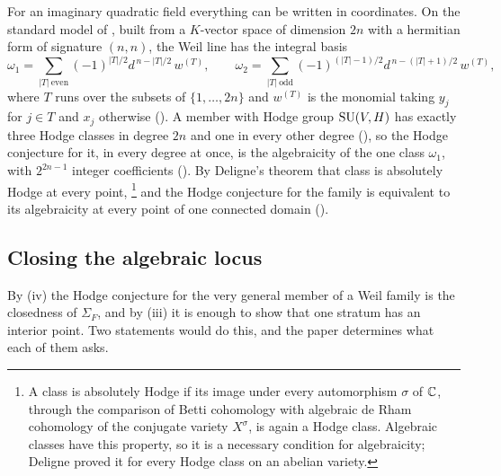 For an imaginary quadratic field everything can be written in coordinates.
On the standard model of , built from a $K$-vector space of
dimension $2n$ with a hermitian form of signature $(n,n)$, the Weil line has
the integral basis
\[
  \omega_{1}=\sum_{|T|\ \mathrm{even}}(-1)^{|T|/2}d^{\,n-|T|/2}\,w^{(T)},
  \qquad
  \omega_{2}=\sum_{|T|\ \mathrm{odd}}(-1)^{(|T|-1)/2}d^{\,n-(|T|+1)/2}\,w^{(T)},
\]
where $T$ runs over the subsets of $\{1,\dots,2n\}$ and $w^{(T)}$ is the
monomial taking $y_{j}$ for $j\in T$ and $x_{j}$ otherwise
(). A member with Hodge group $\operatorname{SU}(V,H)$ has exactly
three Hodge classes in degree $2n$ and one in every other degree
(), so the Hodge conjecture for it, in every degree at
once, is the algebraicity of the one class $\omega_{1}$, with $2^{2n-1}$
integer coefficients (). By Deligne's theorem
\cite{Del82} that class is absolutely Hodge at every point,%
\footnote{A class is absolutely Hodge if its image under every automorphism
$\sigma$ of $\mathbb{C}$, through the comparison of Betti cohomology with
algebraic de Rham cohomology of the conjugate variety $X^{\sigma}$, is again
a Hodge class. Algebraic classes have this property, so it is a necessary
condition for algebraicity; Deligne proved it for every Hodge class on an
abelian variety.}
and the Hodge
conjecture for the family is equivalent to its algebraicity at every point of
one connected domain ().

\subsection{Closing the algebraic locus}

\enlargethispage{2pt}By (iv) the Hodge conjecture for the very general member of a
Weil family is the closedness of $\Sigma_{F}$, and by (iii) it is enough to
show that one stratum has an interior point. Two statements would do this,
and the paper determines what each of them asks.

